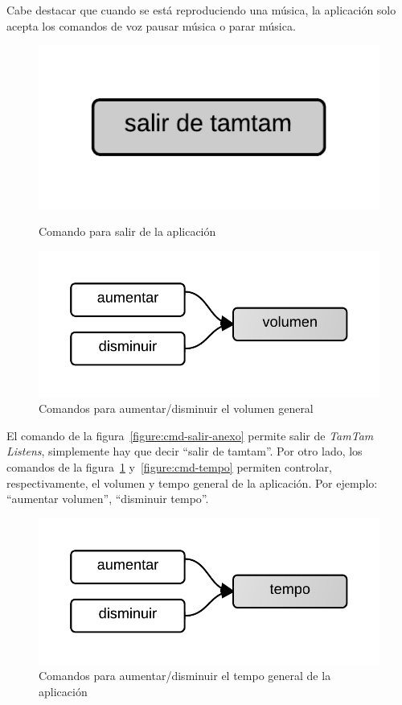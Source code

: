 Cabe destacar que cuando se est\'a reproduciendo una m\'usica, la aplicaci\'on solo acepta los comandos de
voz pausar m\'usica o parar m\'usica.


\begin{figure}[H]
\begin{minipage}[b]{0.5\linewidth}
\centering
\includegraphics[width=0.6\linewidth]{./graphics/salir.png}
\caption{Comando para salir de la aplicaci\'on}
\label{figure:cmd-salir-anexo}
\end{minipage}
\quad
\begin{minipage}[b]{0.5\linewidth}
\centering
\includegraphics[width=0.6\linewidth]{./graphics/cmd-vol.png}
\caption{Comandos para aumentar/disminuir el volumen general}
\label{figure:cmd-vol-anexo}
\end{minipage}
\end{figure}

El comando de la figura~\ref{figure:cmd-salir-anexo} permite salir de \emph{TamTam Listens}, simplemente hay que decir ``salir de tamtam''. Por otro lado, los comandos de la figura~\ref{figure:cmd-vol-anexo}
y~\ref{figure:cmd-tempo} permiten controlar, respectivamente, el volumen y tempo general de la aplicaci\'on. Por ejemplo: ``aumentar volumen'', ``disminuir tempo''.

 \begin{figure}[H]
\begin{minipage}[b]{0.5\linewidth}
\centering
\includegraphics[width=0.6\linewidth]{./graphics/cmd-tempo.png}
\caption{Comandos para aumentar/disminuir el tempo general de la aplicaci\'on}
\label{figure:cmd-tempo-anexo}
\end{minipage}
\end{figure}
 
